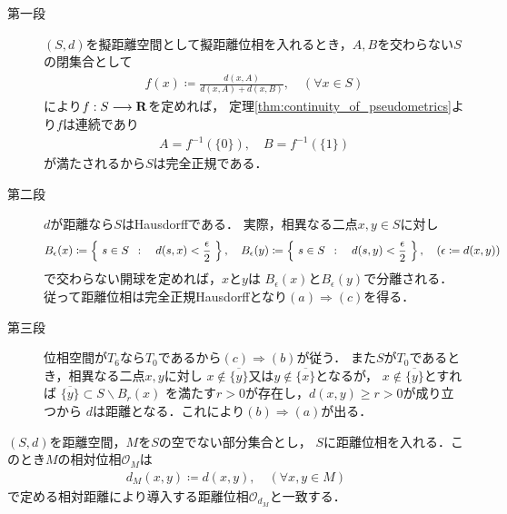 	\begin{prf}\mbox{}
		\begin{description}
			\item[第一段]
				$(S,d)$を擬距離空間として擬距離位相を入れるとき，$A,B$を交わらない$S$の閉集合として
				\begin{align}
					f(x) \coloneqq \frac{d(x,A)}{d(x,A) + d(x,B)},
					\quad (\forall x \in S)
				\end{align}
				により$f:S \longrightarrow \mathbf{R}$を定めれば，
				定理\ref{thm:continuity_of_pseudometrics}より$f$は連続であり
				\begin{align}
					A = f^{-1}(\{0\}),\quad B = f^{-1}(\{1\})
				\end{align}
				が満たされるから$S$は完全正規である．
				
			\item[第二段] 
				$d$が距離なら$S$はHausdorffである．
				実際，相異なる二点$x,y \in S$に対し
				\begin{align}
					B_\epsilon(x) \coloneqq \left\{\ s \in S\ \, : \quad d(s,x) < \frac{\epsilon}{2}\ \right\},
					\quad B_\epsilon(y) \coloneqq \left\{\ s \in S\ \, : \quad d(s,y) < \frac{\epsilon}{2}\ \right\},
					\quad (\epsilon \coloneqq d(x,y))
				\end{align}
				で交わらない開球を定めれば，$x$と$y$は
				$B_\epsilon(x)$と$B_\epsilon(y)$で分離される．
				従って距離位相は完全正規Hausdorffとなり$(a) \Longrightarrow (c)$を得る．
				
			\item[第三段]
				位相空間が$T_6$なら$T_0$であるから$(c) \Longrightarrow (b)$が従う．
				また$S$が$T_0$であるとき，相異なる二点$x,y$に対し
				$x \notin \overline{\{y\}}$又は$y \notin \overline{\{x\}}$となるが，
				$x \notin \overline{\{y\}}$とすれば
				$\overline{\{y\}} \subset S \backslash B_r(x)$
				を満たす$r > 0$が存在し，$d(x,y) \geq r > 0$が成り立つから
				$d$は距離となる．これにより$(b) \Longrightarrow (a)$が出る．
				\QED
		\end{description}
	\end{prf}
	
	\begin{screen}
		\begin{thm}[距離空間の部分空間の距離]
			$(S,d)$を距離空間，$M$を$S$の空でない部分集合とし，
			$S$に距離位相を入れる．このとき$M$の相対位相$\mathscr{O}_M$は
			\begin{align}
				d_M(x,y) \coloneqq d(x,y),
				\quad (\forall x,y \in M)
			\end{align}
			で定める相対距離により導入する距離位相$\mathscr{O}_{d_M}$と一致する．
		\end{thm}
	\end{screen}
	
